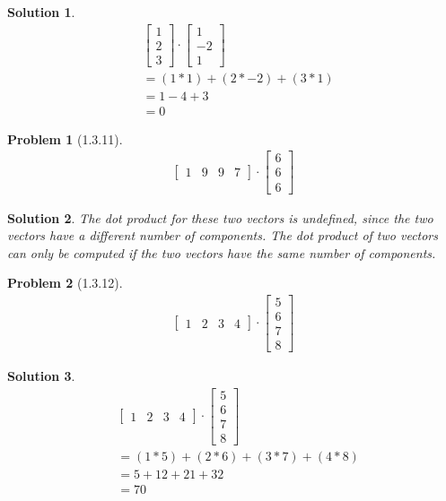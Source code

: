 \documentclass{article}
\newtheorem{problem}{Problem}
\newtheorem*{solution}{Solution}
\begin{document}
\begin{solution}
\begin{align*}
&\begin{bmatrix}
1 \\ 2 \\ 3
\end{bmatrix}
\cdot
\begin{bmatrix}
1 \\ -2 \\ 1
\end{bmatrix} \\
&= (1 * 1) + (2 * -2) + (3 * 1) \\
&=1 - 4 + 3 \\
&= 0
\end{align*}

\end{solution}

\begin{problem}[1.3.11]
\begin{align*}
\begin{bmatrix}
1 & 9 & 9 & 7
\end{bmatrix}
\cdot
\begin{bmatrix}
6 \\ 6 \\ 6
\end{bmatrix}
\end{align*}
\end{problem}

\begin{solution}
The dot product for these two vectors is undefined, since the two vectors have a different number of components. The dot product of two vectors can only be computed if the two vectors have the same number of components.
\end{solution}

\begin{problem}[1.3.12]
\begin{align*}
\begin{bmatrix}
1 & 2 & 3 & 4
\end{bmatrix}
\cdot
\begin{bmatrix}
5 \\ 6 \\ 7 \\ 8
\end{bmatrix}
\end{align*}
\end{problem}

\begin{solution}
\begin{align*}
&\begin{bmatrix}
1 & 2 & 3 & 4
\end{bmatrix}
\cdot
\begin{bmatrix}
5 \\ 6 \\ 7 \\ 8
\end{bmatrix} \\
&= (1 * 5) + (2 * 6) + (3 * 7) + (4 * 8) \\
&= 5 + 12 + 21 + 32 \\
&= 70
\end{align*}
\end{solution}
\end{document}
